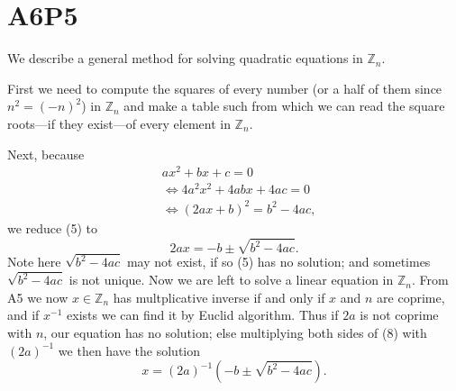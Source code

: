 \documentclass{article}
\begin{document}
\section{A6P5}
We describe a general method for solving quadratic equations in $\mathbb{Z}_n$. 

First we need to compute the squares of every number (or a half of them since $n^2 = (-n)^2$) in $\mathbb{Z}_n$ and make a table such from which we can read the square roots---if they exist---of every element in $\mathbb{Z}_n$.

Next, because
\begin{align}
    &ax^2+bx+c = 0\\
    &\Leftrightarrow 4a^2x^2+4abx+4ac = 0\\
    &\Leftrightarrow (2ax+b)^2
    =b^2-4ac,
\end{align}
we reduce (5) to 
\begin{equation}2ax = -b \pm \sqrt{b^2-4ac}.\end{equation}
Note here $\sqrt{b^2-4ac}$ may not exist, if so (5) has no solution; and sometimes $\sqrt{b^2-4ac}$ is not unique. Now we are left to solve a linear equation in $\mathbb{Z}_n$. From A5 we now $x \in \mathbb{Z}_n$ has multplicative inverse if and only if $x$ and $n$ are coprime, and if $x^{-1}$ exists we can find it by Euclid algorithm. Thus if $2a$ is not coprime with $n$, our equation has no solution; else multiplying both sides of (8) with $(2a)^{-1}$ we then have the solution
\begin{equation}
    x = (2a)^{-1} (-b \pm \sqrt{b^2-4ac}).
\end{equation}

\begin{example}

\end{example}


\end{document}
